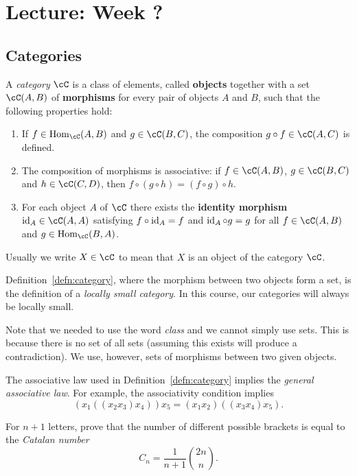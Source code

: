 \section{Lecture: Week ?}

\subsection{Categories}

\begin{definition}
    \label{defn:category}
    A \emph{category} $\cC$ is a class of elements, called 
	\textbf{objects} together with a set
    $\cC(A,B)$ of \textbf{morphisms} 
    for every pair of objects $A$ and $B$, 
    such that
    the following properties hold:
    \begin{enumerate}
		\item If $f\in\Hom_\cC(A,B)$ and 
			$g\in\cC(B,C)$, the composition $g\circ f\in\cC(A,C)$ is defined. 
		\item The composition of morphisms is associative: if 
			$f\in\cC(A,B)$, $g\in\cC(B,C)$ and $h\in\cC(C,D)$, then 
			$f\circ(g\circ h)=(f\circ g)\circ h$.
		\item For each object $A$ of $\cC$ there exists       the \textbf{identity morphism}    $\id_A\in\cC(A,A)$ satisfying $f\circ \operatorname{id}_A=f$ and 
			$\operatorname{id}_A\circ g=g$ for all $f\in\cC(A,B)$ and 
			$g\in\Hom_\cC(B,A)$.
	\end{enumerate}
\end{definition}

Usually we write $X\in\cC$ to mean that
$X$ is an object of the category $\cC$. 

Definition~\ref{defn:category}, where the morphism 
between two objects form a set, is the definition 
of a \emph{locally small category}. In this course, 
our categories 
will always be locally small. 

Note that we needed to use
the word \textit{class} and we cannot simply use 
sets. This is because there is no set of all sets (assuming this exists will produce a contradiction). We use, however, sets of morphisms between two given objects.

The associative law used in Definition~\ref{defn:category} implies the \emph{general 
associative law}. For example, the associativity 
condition implies 
\[
    (x_1((x_2x_3)x_4))x_5=(x_1x_2)((x_3x_4)x_5).
\]

\begin{bonus}
\label{xca:Catalan}
    For $n+1$ letters, prove that the number of different possible 
    brackets is equal to the \emph{Catalan number}
    \[
    C_n=\frac{1}{n+1}\binom{2n}{n}.
    \]
\end{bonus}

